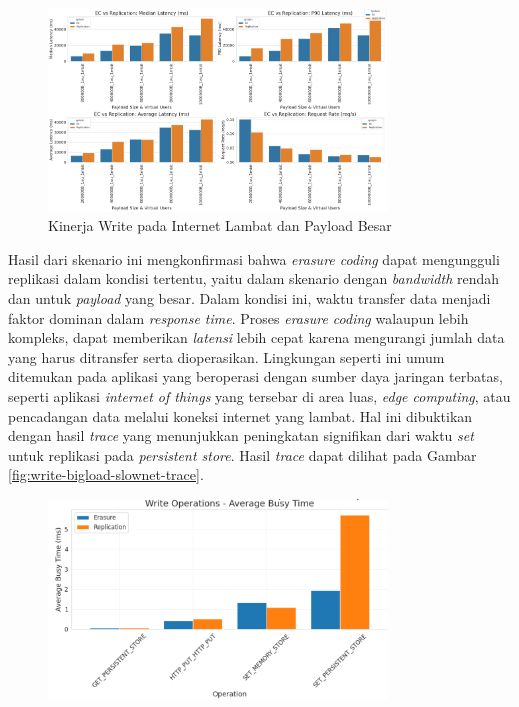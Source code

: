\begin{enumerate}
	      \begin{figure}[ht]
		      \centering
		      \includegraphics[width=0.8\textwidth]{resources/chapter-4/write_bigload_slownet.png}

		      \caption{Kinerja Write pada Internet Lambat dan Payload Besar}
		      \label{fig:write-bigload-slownet}
	      \end{figure}

	      Hasil dari skenario ini mengkonfirmasi bahwa \textit{erasure coding} dapat mengungguli replikasi dalam kondisi tertentu, yaitu dalam skenario dengan \textit{bandwidth} rendah dan untuk \textit{payload} yang besar. Dalam kondisi ini, waktu transfer data menjadi faktor dominan dalam \textit{response time}. Proses \textit{erasure coding} walaupun lebih kompleks, dapat memberikan \textit{latensi} lebih cepat karena mengurangi jumlah data yang harus ditransfer serta dioperasikan. Lingkungan seperti ini umum ditemukan pada aplikasi yang beroperasi dengan sumber daya jaringan terbatas, seperti aplikasi \textit{internet of things} yang tersebar di area luas, \textit{edge computing}, atau pencadangan data melalui koneksi internet yang lambat. Hal ini dibuktikan dengan hasil \textit{trace} yang menunjukkan peningkatan signifikan dari waktu \textit{set} untuk replikasi pada \textit{persistent store}. Hasil \textit{trace} dapat dilihat pada Gambar \ref{fig:write-bigload-slownet-trace}.

	      \begin{figure}[ht]
		      \centering
		      \includegraphics[width=0.8\textwidth]{resources/chapter-4/write_bigload_slownet_trace.png}


\end{figure}
\end{enumerate}
